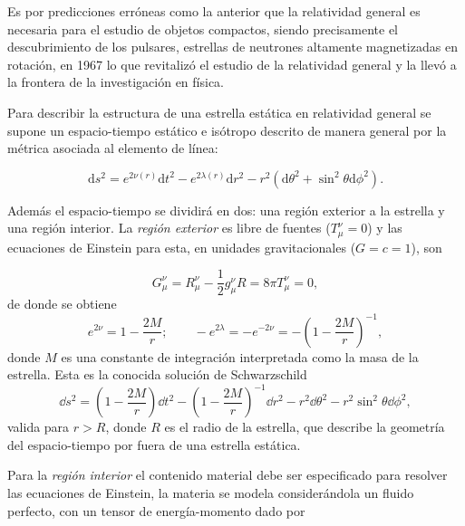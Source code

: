 Es por predicciones erróneas como la anterior que la relatividad general es necesaria para el estudio de objetos compactos, siendo precisamente el descubrimiento de los pulsares, estrellas de neutrones altamente magnetizadas en rotación, en 1967 \cite{Hewish1968} lo que revitalizó el estudio de la relatividad general y la llevó a la frontera de la investigación en física.

Para describir la estructura de una estrella estática en relatividad general se supone un espacio-tiempo estático e isótropo descrito de manera general por la métrica asociada al elemento de línea:

\begin{equation}
\mathrm { d } s ^ { 2 } = e ^ { 2 \nu ( r ) } \mathrm { d } t ^ { 2 } - e ^ { 2 \lambda ( r ) } \mathrm { d } r ^ { 2 } - r ^ { 2 } \left( \mathrm { d } \theta ^ { 2 } + \sin ^ { 2 }  \theta  \mathrm { d } \phi ^ { 2 } \right) .   
\end{equation}

Además el espacio-tiempo se dividirá en dos: una región exterior a la estrella y una región interior. 
La \textit{región exterior} es libre de fuentes ($T _ { \mu } ^ { \nu }=0$) y las ecuaciones de Einstein para esta, en unidades gravitacionales ($G=c=1$), son 

\begin{equation}
    G _ { \mu } ^ { \nu } = R _ { \mu } ^ { \nu } - \frac { 1 } { 2 } g _ { \mu } ^ { \nu } R = 8 \pi T _ { \mu } ^ { \nu }=0,
\end{equation}
de donde se obtiene
\begin{equation}
    e ^ { 2 \nu } = 1 - \frac { 2 M } { r };\quad \quad - e ^ { 2 \lambda } = - e ^ { - 2 \nu } = - \left( 1 - \frac { 2 M } { r } \right) ^ { - 1 },
\end{equation}
donde $M$ es una constante de integración interpretada como la masa de la estrella. Esta es la conocida solución de Schwarzschild
\begin{equation}
    \dd s ^ { 2 } =  \left( 1 - \frac { 2 M } { r } \right) \dd t ^ { 2 } - \left( 1 - \frac { 2 M } { r } \right) ^ { - 1 } \dd r ^ { 2 }  - r ^ { 2 } \dd \theta ^ { 2 } - r ^ { 2 } \sin ^ { 2 } \theta \dd \phi ^ { 2 }, 
\end{equation}
valida para $r>R$, donde $R$ es el radio de la estrella, que describe la geometría del espacio-tiempo por fuera de una estrella estática.

Para la \textit{región interior} el contenido material debe ser especificado para resolver las ecuaciones de Einstein, la materia se modela considerándola un fluido perfecto, con un tensor de energía-momento dado por

